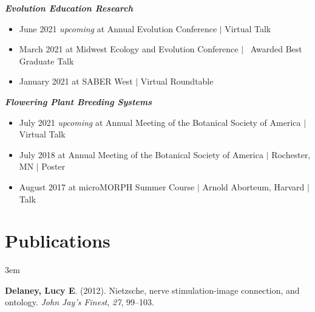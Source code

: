 \documentclass[]{article}
\newlength{\cslhangindent}
\newenvironment{cslreferences}
{\setlength{\parindent}{0pt}
\everypar{\setlength{\hangindent}{\cslhangindent}}\ignorespaces}
{\par}
\begin{document}
\textit{\textbf{Evolution Education Research}}
\begin{itemize}[label=$\mathwitch*$]
\item{June 2021 \textit{upcoming} at Annual Evolution Conference $\vert$ Virtual Talk 
\hspace{0.3mm} \href{https://ledelaney.org/talks/2021evolution}{\faImages} \href{https://github.com/ledelaney/06-21-Evolution}{\faGithub}}
\item{March 2021 at Midwest Ecology and Evolution Conference $\vert$ \faAward\ Awarded Best Graduate Talk \hspace{0.3mm} \href{https://ledelaney.org/talks/2021meec/}{\faImages} \href{https://github.com/ledelaney/03-21-MEEC}{\faGithub}}
\item{January 2021 at SABER West $\vert$ Virtual Roundtable \hspace{0.3mm} \href{https://ledelaney.org/talks/2021saberw/}{\faImages} \href{https://github.com/ledelaney/01-21-SABERwest}{\faGithub}}
\end{itemize}

\vspace{2mm}

\textit{\textbf{Flowering Plant Breeding Systems}}

\begin{itemize}[label=$\mathwitch*$]
\item{July 2021 \textit{upcoming} at Annual Meeting of the Botanical Society of America $\vert$ Virtual Talk}
\item{July 2018 at Annual Meeting of the Botanical Society of America $\vert$ Rochester, MN $\vert$ Poster \hspace{0.3mm} \href{https://ledelaney.org/static/posters/poster.png}{\faFileImage}}
\item{August 2017 at microMORPH Summer Course $\vert$ Arnold Aborteum, Harvard $\vert$ Talk \hspace{0.3mm} \href{https://www.dropbox.com/s/o7hcg5riw97wf9i/08-2017-microMORPH.pdf?dl=1}{\faImages}}
\end{itemize}
\vspace{1mm}

\section{Publications}

\vspace{3mm}
\leftskip 3em

\begin{cslreferences}
\textbf{Delaney, Lucy E}. (2012). Nietzsche, nerve stimulation-image connection, and ontology. \emph{John Jay's Finest}, \emph{27}, 99--103. \href{https://ledelaney.org/static/docs/Delaney-JJAYFinest.pdf}{\faFile}\\
\end{cslreferences}
\end{document}
